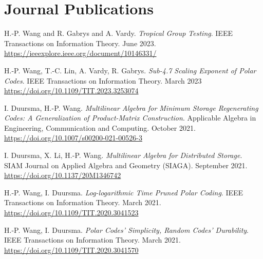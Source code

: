 \documentclass{article}
\begin{document}
\section{Journal Publications}

\bgroup
\def\section#1#2{}
\begin{thebibliography}{9}
    \bibitem{}
    H.-P. Wang and R. Gabrys and A. Vardy.
    \emph{Tropical Group Testing}.
    IEEE Transactions on Information Theory.
    June 2023.
    \url{https://ieeexplore.ieee.org/document/10146331/}

    \bibitem{}
    H.-P. Wang, T.-C. Lin, A. Vardy, R. Gabrys.
    \emph{Sub-4.7 Scaling Exponent of Polar Codes}.
    IEEE Transactions on Information Theory.
    March 2023
    \url{https://doi.org/10.1109/TIT.2023.3253074}

    \bibitem{}
    I. Duursma, H.-P. Wang.
    \emph{Multilinear Algebra for Minimum Storage Regenerating Codes:
        A Generalization of Product-Matrix Construction}.
    Applicable Algebra in Engineering, Communication and Computing.
    October 2021.
    \url{https://doi.org/10.1007/s00200-021-00526-3}

    \bibitem{}
    I. Duursma, X. Li, H.-P. Wang.
    \emph{Multilinear Algebra for Distributed Storage}.
    SIAM Journal on Applied Algebra and Geometry (SIAGA).
    September 2021.
    \url{https://doi.org/10.1137/20M1346742}

    \bibitem{}
    H.-P. Wang, I. Duursma.
    \emph{Log-logarithmic Time Pruned Polar Coding}.
    IEEE Transactions on Information Theory.
    March 2021.
    \url{https://doi.org/10.1109/TIT.2020.3041523}

    \bibitem{}
    H.-P. Wang, I. Duursma.
    \emph{Polar Codes' Simplicity, Random Codes' Durability}.
    IEEE Transactions on Information Theory.
    March 2021.
    \url{https://doi.org/10.1109/TIT.2020.3041570}
\end{thebibliography}
\end{document}
